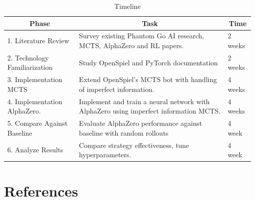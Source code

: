 \documentclass[12pt,oneside,openright]{article}
\begin{document}
\begin{table}[H]
    \caption{Timeline}
    \centering
    \begin{tabularx}{\textwidth}{X|X|l}
        \toprule
        \multicolumn{1}{c}{Phase}     &
        \multicolumn{1}{c}{Task}      &
        \multicolumn{1}{c}{Time}                                                                                                        \\
        \midrule
        1. Literature Review          & Survey existing Phantom Go AI research, MCTS, AlphaZero and RL papers.                & 2 weeks \\
        \hline
        2. Technology Familiarization & Study OpenSpiel and PyTorch documentation                                             & 2 weeks \\
        \hline
        3. Implementation MCTS        & Extend OpenSpiel's MCTS bot with handling of imperfect information.                   & 4 weeks \\
        \hline
        4. Implementation AlphaZero.  & Implement and train a neural network with AlphaZero using imperfect information MCTS. & 4 weeks \\
        \hline
        5. Compare Against Baseline   & Evaluate AlphaZero performance against baseline with random rollouts                  & 4 week  \\
        \hline
        6. Analyze Results            & Compare strategy effectiveness, tune hyperparameters.                                 & 4 week  \\
        \hline
    \end{tabularx}
    \label{tab:timeline}
\end{table}


\section{References}
\printbibliography[heading=none]
\end{document}
